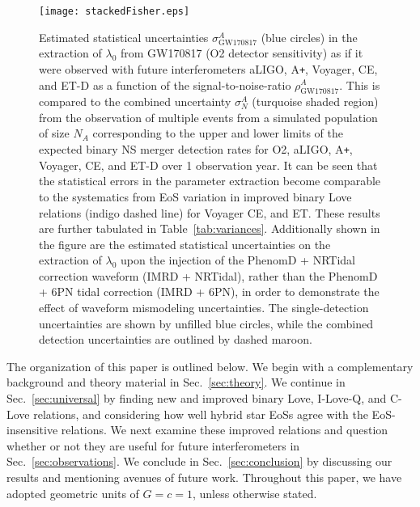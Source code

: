 \documentclass[prd,twocolumn,nofootinbib,superscriptaddress,amsmath,amssymb]{revtex4-1}
\begin{document}
\begin{figure}
\begin{center} 
\texttt{[image: stackedFisher.eps]}
\end{center}
\caption{
Estimated statistical uncertainties $\sigma^A_{\text{GW170817}}$ (blue circles) in the extraction of $\lambda_0$ from GW170817 (O2 detector sensitivity) as if it were observed with future interferometers aLIGO, A\texttt{+}, Voyager, CE, and ET-D as a function of the signal-to-noise-ratio $\rho^A_{\text{GW170817}}$.
This is compared to the combined uncertainty $\sigma^A_N$ (turquoise shaded region) from the observation of multiple events from a simulated population of size $N_A$ corresponding to the upper and lower limits of the expected binary NS merger detection rates for O2, aLIGO, A\texttt{+}, Voyager, CE, and ET-D over 1 observation year.
It can be seen that the statistical errors in the parameter extraction become comparable to the systematics from EoS variation in improved binary Love relations (indigo dashed line) for Voyager CE, and ET.
These results are further tabulated in Table~\ref{tab:variances}.
Additionally shown in the figure are the estimated statistical uncertainties on the extraction of $\lambda_0$ upon the injection of the PhenomD + NRTidal correction waveform (IMRD + NRTidal), rather than the PhenomD + 6PN tidal correction (IMRD + 6PN), in order to demonstrate the effect of waveform mismodeling uncertainties.
The single-detection uncertainties are shown by unfilled blue circles, while the combined detection uncertainties are outlined by dashed maroon.
}
\label{fig:stackedFisher}
\end{figure} 

The organization of this paper is outlined below.
We begin with a complementary background and theory material in Sec.~\ref{sec:theory}.
We continue in Sec.~\ref{sec:universal} by finding new and improved binary Love, I-Love-Q, and C-Love relations, and considering how well hybrid star EoSs agree with the EoS-insensitive relations.
We next examine these improved relations and question whether or not they are useful for future interferometers in Sec.~\ref{sec:observations}.
We conclude in Sec.~\ref{sec:conclusion} by discussing our results and mentioning avenues of future work.
Throughout this paper, we have adopted geometric units of $G=c=1$, unless otherwise stated.

\end{document}

